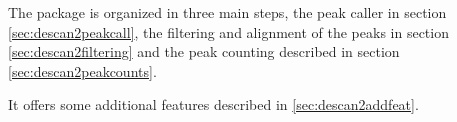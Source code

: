 The package is organized in three main steps, the peak caller in section \ref{sec:descan2peakcall}, the filtering and alignment of the peaks in section \ref{sec:descan2filtering} and the peak counting described in section \ref{sec:descan2peakcounts}.

It offers some additional features described in \ref{sec:descan2addfeat}.
